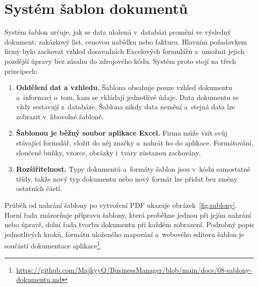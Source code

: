 \section{Systém šablon dokumentů}\label{sec:sablony}

Systém šablon určuje, jak se data uložená v~databázi promění ve výsledný dokument: zakázkový list, cenovou nabídku nebo fakturu. Hlavním požadavkem firmy bylo zachovat vzhled dosavadních Excelových formulářů a~umožnit jejich pozdější úpravy bez zásahu do zdrojového kódu. Systém proto stojí na třech principech:

\begin{enumerate}
\item \textbf{Oddělení dat a vzhledu.} Šablona obsahuje pouze vzhled dokumentu a~informaci o~tom, kam se vkládají jednotlivé údaje. Data dokumentu se vždy sestavují z~databáze. Šablona nikdy data nemění a~stejná data lze zobrazit v~libovolné šabloně.
\item \textbf{Šablonou je běžný soubor aplikace Excel.} Firma může vzít svůj stávající formulář, vložit do něj značky a~nahrát ho do aplikace. Formátování, sloučené buňky, vzorce, obrázky i~tvary zůstanou zachovány.
\item \textbf{Rozšiřitelnost.} Typy dokumentů a~formáty šablon jsou v~kódu samostatné třídy, takže nový typ dokumentu nebo nový formát lze přidat bez změny ostatních částí.
\end{enumerate}

Průběh od nahrání šablony po vytvoření PDF ukazuje obrázek~\ref{fig:sablony}. Horní řada znázorňuje přípravu šablony, která proběhne jednou při jejím nahrání nebo úpravě, dolní řada tvorbu dokumentu při každém zobrazení. Podrobný popis jednotlivých kroků, formátu uloženého mapování a~webového editoru šablon je součástí dokumentace aplikace\footnote{\url{https://github.com/MajkyyQ/BusinessManager/blob/main/docs/08-sablony-dokumentu.md}}.

